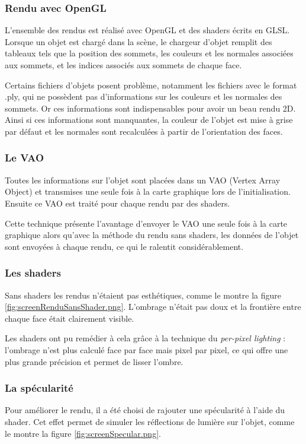 \subsubsection{Rendu avec OpenGL}
L'ensemble des rendus est réalisé avec OpenGL et des shaders écrits en GLSL. Lorsque un objet est chargé dans la scène, le chargeur d'objet remplit des tableaux tels que la position des sommets, les couleurs et les normales associées aux sommets, et les indices associés aux sommets de chaque face.

Certains fichiers d'objets posent problème, notamment les fichiers avec le format .ply, qui ne possèdent pas d'informations sur les couleurs et les normales des sommets. Or ces informations sont indispensables pour avoir un beau rendu 2D. Ainsi si ces informations sont manquantes, la couleur de l'objet est mise à grise par défaut et les normales sont recalculées à partir de l'orientation des faces.


\subsubsection{Le VAO}
Toutes les informations sur l'objet sont placées dans un VAO (Vertex Array Object) et transmises une seule fois à la carte graphique lors de l'initialisation. Ensuite ce VAO est traité pour chaque rendu par des shaders.

Cette technique présente l'avantage d'envoyer le VAO une seule fois à la carte graphique alors qu'avec la méthode du rendu sans shaders, les données de l'objet sont envoyées à chaque rendu, ce qui le ralentit considérablement.

\subsubsection{Les shaders}
Sans shaders les rendus n'étaient pas esthétiques, comme le montre la figure \ref{fig:screenRenduSansShader.png}. L'ombrage n'était pas doux et la frontière entre chaque face était clairement visible. 

Les shaders ont pu remédier à cela grâce à la technique du \textit{per-pixel lighting} : l'ombrage n'est plus calculé face par face mais pixel par pixel, ce qui offre une plus grande précision et permet de lisser l'ombre.

\subsubsection{La spécularité}
Pour améliorer le rendu, il a été choisi de rajouter une spécularité à l'aide du shader. Cet effet permet de simuler les réflections de lumière sur l'objet, comme le montre la figure \ref{fig:screenSpecular.png}.

